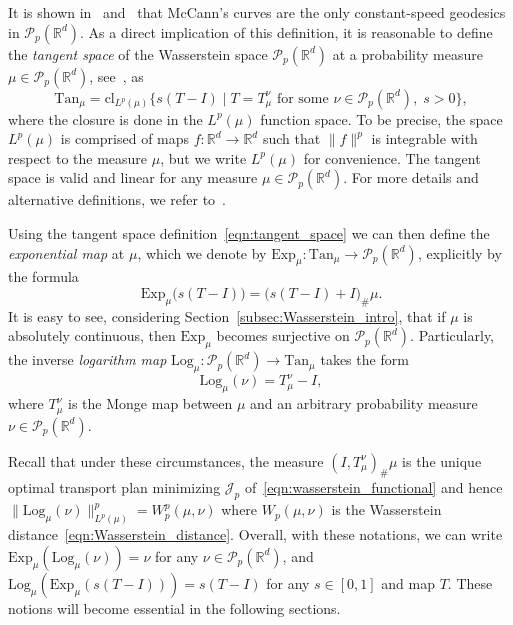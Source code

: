 \documentclass[12pt]{amsart}
\begin{document}
It is shown in~\cite[Proposition 5.32]{santambrogio2015optimal} and~\cite[Chapter 7]{ambrosio2008gradient} that McCann's curves are the only constant-speed geodesics in $\mathcal{P}_p(\mathbb{R}^d)$. As a direct implication of this definition, it is reasonable to define the \emph{tangent space} of the Wasserstein space $\mathcal{P}_p(\mathbb{R}^d)$ at a probability measure $\mu\in\mathcal{P}_p(\mathbb{R}^d)$, see~\cite[Definition 8.5.1]{ambrosio2008gradient}, as
\begin{equation}~\label{eqn:tangent_space}
    \text{Tan}_\mu= \text{cl}_{L^p(\mu)}\{ s(T-I) \; | \; T=T_{\mu}^\nu \text{ for some } \nu\in\mathcal{P}_p(\mathbb{R}^d),\; s>0\},
\end{equation}
where the closure is done in the $L^p(\mu)$ function space. To be precise, the space $L^p(\mu)$ is comprised of maps $f:\mathbb{R}^d\rightarrow\mathbb{R}^d$ such that $\|f\|^p$ is integrable with respect to the measure $\mu$, but we write $L^p(\mu)$ for convenience. The tangent space is valid and linear for any measure $\mu\in\mathcal{P}_p(\mathbb{R}^d)$. For more details and alternative definitions, we refer to~\cite[Chapter 8]{ambrosio2008gradient}.

Using the tangent space definition~\eqref{eqn:tangent_space} we can then define the \emph{exponential map} at $\mu$, which we denote by $\text{Exp}_\mu:\text{Tan}_\mu\rightarrow\mathcal{P}_p(\mathbb{R}^d)$, explicitly by the formula
\begin{equation}~\label{eqn:exp_map}
    \text{Exp}_\mu\big(s(T-I)\big) = \big( s(T-I) + I \big)_\# \mu.
\end{equation}
It is easy to see, considering Section~\ref{subsec:Wasserstein_intro}, that if $\mu$ is absolutely continuous, then $\text{Exp}_\mu$ becomes surjective on $\mathcal{P}_p(\mathbb{R}^d)$. Particularly, the inverse \emph{logarithm map} $\text{Log}_\mu:\mathcal{P}_p(\mathbb{R}^d)\rightarrow \text{Tan}_\mu$ takes the form
\begin{equation}~\label{eqn:log_map}
    \text{Log}_\mu(\nu) = T_{\mu}^{\nu} - I,
\end{equation}
where $T_{\mu}^{\nu}$ is the Monge map between $\mu$ and an arbitrary probability measure $\nu\in\mathcal{P}_p(\mathbb{R}^d)$.

Recall that under these circumstances, the measure $(I, T_{\mu}^{\nu})_\#\mu$ is the unique optimal transport plan minimizing $\mathcal{J}_p$ of~\eqref{eqn:wasserstein_functional} and hence $\|\text{Log}_\mu(\nu)\|^p_{L^p(\mu)}=W^p_p(\mu, \nu)$ where $W_p(\mu, \nu)$ is the Wasserstein distance~\eqref{eqn:Wasserstein_distance}. Overall, with these notations, we can write $\text{Exp}_\mu(\text{Log}_\mu(\nu)) = \nu$ for any $\nu\in\mathcal{P}_p(\mathbb{R}^d)$, and $\text{Log}_\mu(\text{Exp}_\mu(s(T-I)))=s(T-I)$ for any $s\in[0, 1]$ and map $T$. These notions will become essential in the following sections.
\end{document}
